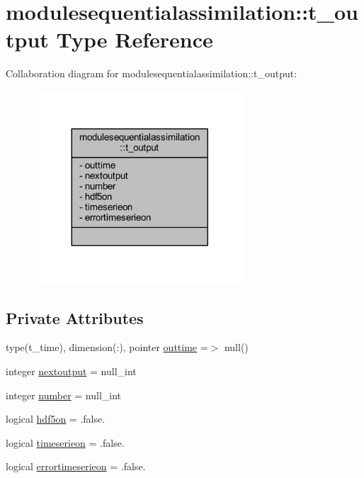 \hypertarget{structmodulesequentialassimilation_1_1t__output}{}\section{modulesequentialassimilation\+:\+:t\+\_\+output Type Reference}
\label{structmodulesequentialassimilation_1_1t__output}


Collaboration diagram for modulesequentialassimilation\+:\+:t\+\_\+output\+:\nopagebreak
\begin{figure}[H]
\begin{center}
\leavevmode
\includegraphics[width=224pt]{structmodulesequentialassimilation_1_1t__output__coll__graph}
\end{center}
\end{figure}
\subsection*{Private Attributes}
\begin{DoxyCompactItemize}
\item 
type(t\+\_\+time), dimension(\+:), pointer \mbox{\hyperlink{structmodulesequentialassimilation_1_1t__output_a2b9d061276a8b9a34817855efc5fa073}{outtime}} =$>$ null()
\item 
integer \mbox{\hyperlink{structmodulesequentialassimilation_1_1t__output_a2fd800e4e424a2c100f8752a318e0239}{nextoutput}} = null\+\_\+int
\item 
integer \mbox{\hyperlink{structmodulesequentialassimilation_1_1t__output_ab23eb738a9b7c9eb23c66100a8be8aec}{number}} = null\+\_\+int
\item 
logical \mbox{\hyperlink{structmodulesequentialassimilation_1_1t__output_a6f9af5bd5b6c3b642253b90048996192}{hdf5on}} = .false.
\item 
logical \mbox{\hyperlink{structmodulesequentialassimilation_1_1t__output_a68e101e5135d07f1540ccdbb016240f2}{timeserieon}} = .false.
\item 
logical \mbox{\hyperlink{structmodulesequentialassimilation_1_1t__output_ab63c2df562014a00cd8d4220b96718f2}{errortimeserieon}} = .false.
\end{DoxyCompactItemize}


